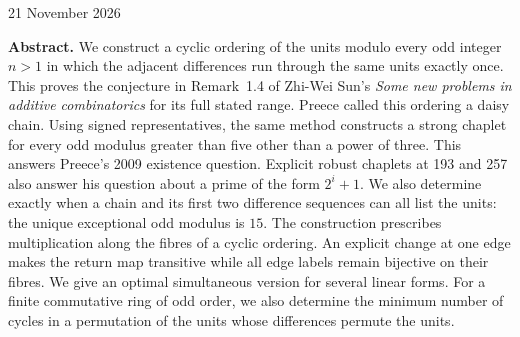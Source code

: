 \documentclass[11pt,a4paper]{article}
\begin{document}
\thispagestyle{plain}
\hfill
{\small 21 November 2026}\par
\vspace{.7em}
\par
\vspace{.25em}
\par
\vspace{.6em}
\par
\vspace{.8em}
\noindent\textbf{Abstract.}
We construct a cyclic ordering of the units modulo every odd integer $n>1$ in which the adjacent differences run through the same units exactly once. This proves the conjecture in Remark~1.4 of Zhi-Wei Sun's \emph{Some new problems in additive combinatorics} for its full stated range. Preece called this ordering a daisy chain. Using signed representatives, the same method constructs a strong chaplet for every odd modulus greater than five other than a power of three. This answers Preece's 2009 existence question. Explicit robust chaplets at 193 and 257 also answer his question about a prime of the form $2^i+1$. We also determine exactly when a chain and its first two difference sequences can all list the units: the unique exceptional odd modulus is $15$. The construction prescribes multiplication along the fibres of a cyclic ordering. An explicit change at one edge makes the return map transitive while all edge labels remain bijective on their fibres. We give an optimal simultaneous version for several linear forms. For a finite commutative ring of odd order, we also determine the minimum number of cycles in a permutation of the units whose differences permute the units.
\end{document}
